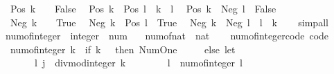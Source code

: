 \begin{isabellebody}
\ \ {\isachardoublequoteopen}Pos\ k\ {\isacharless}{\kern0pt}\ {}\ {\isasymlongleftrightarrow}\ False{\isachardoublequoteclose}\isanewline
\ \ {\isachardoublequoteopen}Pos\ k\ {\isacharless}{\kern0pt}\ Pos\ l\ {\isasymlongleftrightarrow}\ k\ {\isacharless}{\kern0pt}\ l{\isachardoublequoteclose}\isanewline
\ \ {\isachardoublequoteopen}Pos\ k\ {\isacharless}{\kern0pt}\ Neg\ l\ {\isasymlongleftrightarrow}\ False{\isachardoublequoteclose}\isanewline
\ \ {\isachardoublequoteopen}Neg\ k\ {\isacharless}{\kern0pt}\ {}\ {\isasymlongleftrightarrow}\ True{\isachardoublequoteclose}\isanewline
\ \ {\isachardoublequoteopen}Neg\ k\ {\isacharless}{\kern0pt}\ Pos\ l\ {\isasymlongleftrightarrow}\ True{\isachardoublequoteclose}\isanewline
\ \ {\isachardoublequoteopen}Neg\ k\ {\isacharless}{\kern0pt}\ Neg\ l\ {\isasymlongleftrightarrow}\ l\ {\isacharless}{\kern0pt}\ k{\isachardoublequoteclose}\isanewline
%
\isadelimproof
\ \ %
\endisadelimproof
%
\isatagproof
{}\isamarkupfalse%
\ simp{\isacharunderscore}{\kern0pt}all%
\endisatagproof
{\isafoldproof}%
%
\isadelimproof
\isanewline
%
\endisadelimproof
\isanewline
{}\isamarkupfalse%
\ num{\isacharunderscore}{\kern0pt}of{\isacharunderscore}{\kern0pt}integer\ {\isacharcolon}{\kern0pt}{\isacharcolon}{\kern0pt}\ {\isachardoublequoteopen}integer\ {\isasymRightarrow}\ num{\isachardoublequoteclose}\isanewline
\ \ \ {\isachardoublequoteopen}num{\isacharunderscore}{\kern0pt}of{\isacharunderscore}{\kern0pt}nat\ {\isasymcirc}\ nat{\isachardoublequoteclose}\isanewline
%
\isadelimproof
\ \ %
\endisadelimproof
%
\isatagproof
\isacommand{{\isachardot}{\kern0pt}}\isamarkupfalse%
%
\endisatagproof
{\isafoldproof}%
%
\isadelimproof
\isanewline
%
\endisadelimproof
\isanewline
{}\isamarkupfalse%
\ num{\isacharunderscore}{\kern0pt}of{\isacharunderscore}{\kern0pt}integer{\isacharunderscore}{\kern0pt}code\ {\isacharbrackleft}{\kern0pt}code{\isacharbrackright}{\kern0pt}{\isacharcolon}{\kern0pt}\isanewline
\ \ {\isachardoublequoteopen}num{\isacharunderscore}{\kern0pt}of{\isacharunderscore}{\kern0pt}integer\ k\ {\isacharequal}{\kern0pt}\ {\isacharparenleft}{\kern0pt}if\ k\ {\isasymle}\ {}\ then\ Num{\isachardot}{\kern0pt}One\isanewline
\ \ \ \ \ else\ let\isanewline
\ \ \ \ \ \ \ {\isacharparenleft}{\kern0pt}l{\isacharcomma}{\kern0pt}\ j{\isacharparenright}{\kern0pt}\ {\isacharequal}{\kern0pt}\ divmod{\isacharunderscore}{\kern0pt}integer\ k\ {}{\isacharsemicolon}{\kern0pt}\isanewline
\ \ \ \ \ \ \ l{\isacharprime}{\kern0pt}\ {\isacharequal}{\kern0pt}\ num{\isacharunderscore}{\kern0pt}of{\isacharunderscore}{\kern0pt}integer\ l{\isacharsemicolon}{\kern0pt}\isanewline

\end{isabellebody}
